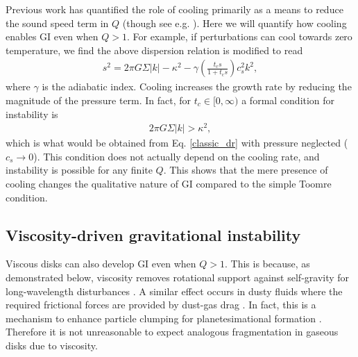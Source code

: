 \documentclass[iop, numberedappendix]{emulateapj}
\newcommand{\tcool}{t_\mathrm{c}}
\begin{document}
Previous work has quantified the role of cooling primarily as a means to reduce the sound speed term
in $Q$ (though see e.g. \citealt{clarke07}). Here we will quantify how cooling enables GI
even when $Q>1$. For example, if perturbations can
cool towards zero temperature, we find the above dispersion relation is
modified to read 
\begin{align}\label{cool_dr}
s^2 = 2\pi G\Sigma |k| - \kappa^2 - \gamma \left(\frac{\tcool s}{1 +
  \tcool s}\right)c_s^2k^2,
\end{align}
where $\gamma$ is the adiabatic index. Cooling increases the growth
rate by reducing the magnitude of the 
pressure term. In fact, for $t_c\in[0,\infty)$ a formal condition
for instability is  
\begin{align*}
  2\pi G \Sigma |k| > \kappa^2,
\end{align*}
which is what would be obtained from Eq. \ref{classic_dr} with 
pressure neglected ($c_s\to 0$). This condition does not actually
depend on the cooling rate, and instability is
possible for any finite $Q$. %
This shows that the mere presence of
cooling changes the qualitative nature of GI compared to the simple
Toomre condition.   




\subsection{Viscosity-driven gravitational instability}\label{visc_gi}
Viscous disks can also develop GI even when $Q>1$. This is because, as 
demonstrated below, viscosity removes rotational support against  
self-gravity for long-wavelength disturbances 
\citep{lynden-bell74,willerding92,gammie96}. A similar effect   
occurs in dusty fluids where the required frictional forces are 
provided by dust-gas drag \citep{ward00, takahashi14}. 
In fact, this
is a mechanism to enhance particle clumping for planetesimational
formation %
\citep{youdin11}. Therefore it is not unreasonable to expect analogous
fragmentation in gaseous disks due to viscosity.   
\end{document}
